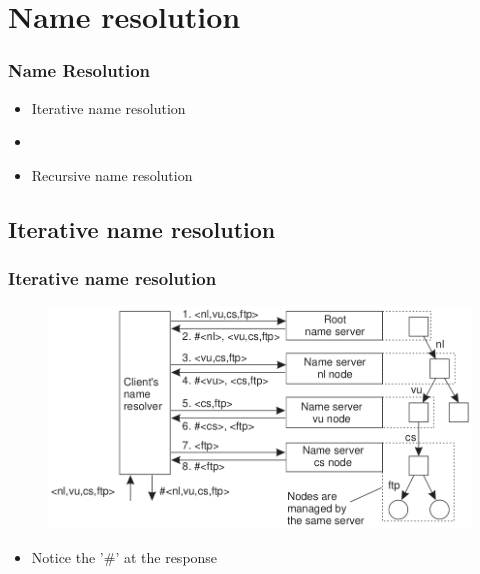 \documentclass{beamer}
\begin{document}
	
\section{Name resolution}
	\begin{frame}
		\frametitle{Name Resolution}
		
			\begin{itemize}
			\item Iterative name resolution
			\item[]
			\item Recursive name resolution
			\end{itemize}
		
	\end{frame}
	
\subsection{Iterative name resolution}
	\begin{frame}
		\frametitle{Iterative name resolution}
		
		\begin{figure}[hbtp]
		\centering
		\includegraphics[scale=0.45]{iterativ}
		\end{figure}
		
		\begin{itemize}
		\item Notice the '\#' at the response
		\end{itemize}
		
	\end{frame}
	
\end{document}
